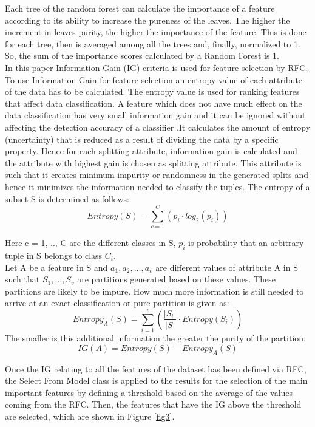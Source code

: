 \documentclass[runningheads]{llncs}
\begin{document}
Each tree of the random forest can calculate the importance of a feature according to its ability to increase the pureness of the leaves. 
The higher the increment in leaves purity, the higher the importance of the feature. This is done for each tree, then is averaged among all the trees and, finally, normalized to 1. 
So, the sum of the importance scores calculated by a Random Forest is 1.\\
In this paper Information Gain (IG) criteria is used for feature selection by RFC. To use Information Gain for feature selection an entropy value of each attribute of the data has to be calculated. 
The entropy value is used for ranking features that affect data classification. A feature which does not have much effect on the data classification has very small information gain and it can be 
ignored without affecting the detection accuracy of a classifier \cite{paper_ig}.It calculates the amount of entropy (uncertainty) that is reduced as a result of dividing the data by a specific property.
Hence for each splitting attribute, information gain is calculated and the attribute with highest gain is chosen as splitting attribute. 
This attribute is such that it creates minimum impurity or randomness in the generated splits and hence it minimizes the information needed to classify the tuples.
The entropy of a subset S is determined as follows:
\begin{equation}
Entropy(S) = \sum_{c=1}^{C} (p_i \cdot log_2(p_i))
\end{equation}

Here c = 1, .., C are the different classes in S, $p_i$ is probability that an arbitrary tuple in S belongs to class $C_i$.\\
Let A be a feature in S and ${a_1, a_2,…, a_v}$ are different values of attribute A in S such that ${S_1, …, S_v}$ are partitions generated based on these values. 
These partitions are likely to be impure. How much more information is still needed to arrive at an exact classification or pure partition is given as:
\begin{equation}
    Entropy_A(S) = \sum_{i=1}^{v} (\frac{|S_i|}{|S|} \cdot Entropy(S_i))
\end{equation}
The smaller is this additional information the greater the purity of the partition.
\begin{equation}
    IG(A) = Entropy(S) - Entropy_A(S)
\end{equation}

Once the IG relating to all the features of the dataset has been defined via RFC, the Select From Model class is applied to the results for the selection of the main important features by defining
a threshold based on the average of the values coming from the RFC. Then, the features that have the IG above the threshold are selected, which are shown in Figure \ref{fig3}.
\end{document}
